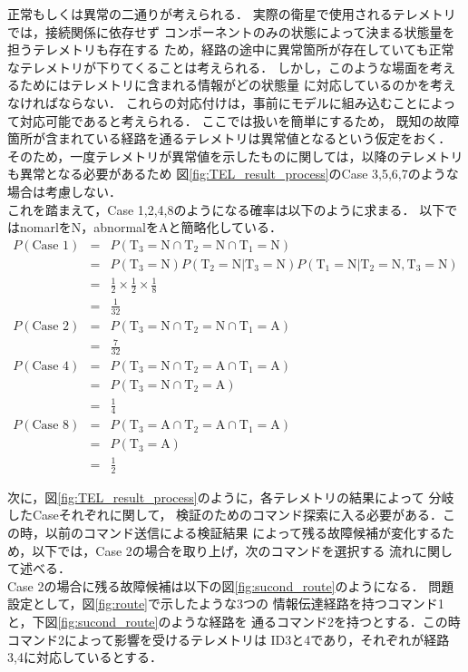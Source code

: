\documentclass[11pt]{jsreport}
\begin{document}
正常もしくは異常の二通りが考えられる．
実際の衛星で使用されるテレメトリでは，接続関係に依存せず
コンポーネントのみの状態によって決まる状態量を担うテレメトリも存在する
ため，経路の途中に異常箇所が存在していても正常なテレメトリが下りてくることは考えられる．
しかし，このような場面を考えるためにはテレメトリに含まれる情報がどの状態量
に対応しているのかを考えなければならない．
これらの対応付けは，事前にモデルに組み込むことによって対応可能であると考えられる．
ここでは扱いを簡単にするため，
既知の故障箇所が含まれている経路を通るテレメトリは異常値となるという仮定をおく．
そのため，一度テレメトリが異常値を示したものに関しては，以降のテレメトリも異常となる必要があるため
図\ref{fig:TEL_result_process}のCase 3,5,6,7のような場合は考慮しない．\\
これを踏まえて，Case 1,2,4,8のようになる確率は以下のように求まる．
以下ではnomarlをN，abnormalをAと簡略化している．
\begin{eqnarray}
   P(\text{Case 1}) &=& P(\text{T}_3=\text{N}\cap\text{T}_2=\text{N}\cap
   \text{T}_1=\text{N}) \nonumber \\
    &=& P(\text{T}_3=\text{N})
   P(\text{T}_2=\text{N}|\text{T}_3=\text{N})
   P(\text{T}_1=\text{N}|\text{T}_2=\text{N},\text{T}_3=\text{N}) \nonumber \\
   &=& \frac{1}{2}\times\frac{1}{2}\times\frac{1}{8}\nonumber \\
     &=& \frac{1}{32} \\
   P(\text{Case 2})  &=& P(\text{T}_3=\text{N}\cap\text{T}_2=\text{N}\cap
   \text{T}_1=\text{A}) \nonumber \\
      &=& \frac{7}{32} \\
P(\text{Case 4})  &=& P(\text{T}_3=\text{N}\cap\text{T}_2=\text{A}\cap
   \text{T}_1=\text{A}) \nonumber \\
   &=& P(\text{T}_3=\text{N}\cap\text{T}_2=\text{A}) \nonumber\\
      &=& \frac{1}{4} \\
P(\text{Case 8})  &=& P(\text{T}_3=\text{A}\cap\text{T}_2=\text{A}\cap
   \text{T}_1=\text{A}) \nonumber \\
   &=& P(\text{T}_3=\text{A}) \nonumber\\
      &=& \frac{1}{2} 
\end{eqnarray}

次に，図\ref{fig:TEL_result_process}のように，各テレメトリの結果によって
分岐したCaseそれぞれに関して，
検証のためのコマンド探索に入る必要がある．この時，以前のコマンド送信による検証結果
によって残る故障候補が変化するため，以下では，Case 2の場合を取り上げ，次のコマンドを選択する
流れに関して述べる．\\
Case 2の場合に残る故障候補は以下の図\ref{fig:sucond_route}のようになる．
問題設定として，図\ref{fig:route}で示したような3つの
情報伝達経路を持つコマンド1と，下図\ref{fig:sucond_route}のような経路を
通るコマンド2を持つとする．この時コマンド2によって影響を受けるテレメトリは
ID3と4であり，それぞれが経路3,4に対応しているとする．
\end{document}
